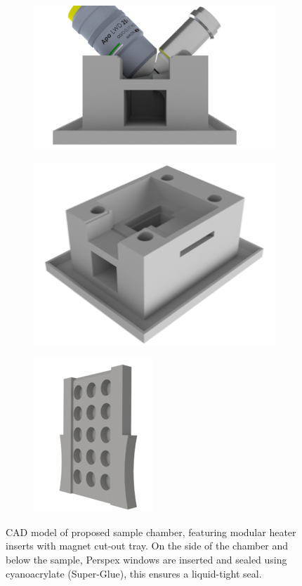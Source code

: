 \begin{figure}
    \centering
    \begin{subfigure}[b]{\linewidth}
         \centering
        \includegraphics{./chamber_side}
         \caption{}
         \label{fig:chamber_side}
    \end{subfigure}
    \begin{subfigure}[b]{0.4\linewidth}
             \centering
        \includegraphics{./chamber_top}
         \caption{}
         \label{fig:chamber_top}
    \end{subfigure}
    \begin{subfigure}[b]{0.4\linewidth}
             \centering
        \includegraphics{./chamber_slide}
         \caption{}
         \label{fig:chamber_slide}
    \end{subfigure}
    \caption{CAD model of proposed sample chamber, featuring modular heater inserts with magnet cut-out tray.
    On the side of the chamber and below the sample, Perspex windows are inserted and sealed using cyanoacrylate (Super-Glue), this ensures a liquid-tight seal.}
\end{figure}

